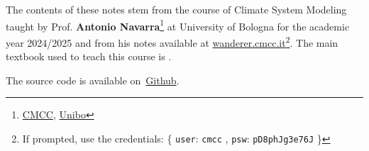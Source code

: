 \documentclass[
    11pt, 
    twoside, 
    english
]{book} %
\begin{document}


\clearpage

\vspace*{\fill}
The contents of these notes stem from the course of Climate System Modeling taught by Prof. \textbf{Antonio Navarra}\footnote{\href{https://www.cmcc.it/people/navarra-a}{CMCC}, \href{https://www.unibo.it/sitoweb/antonio.navarra/en}{Unibo}}
at University of Bologna for the academic year 2024/2025 and from his notes available at
\href{https://wanderer.cmcc.it}{wanderer.cmcc.it}\footnote{
	If prompted, use the credentials: \{ \texttt{user}: \texttt{cmcc}  ,
	\texttt{psw}: \texttt{pD8phJg3e76J} \} }.
The main textbook used to teach this course is \citet{Washington2005}.

The source code is available on~\href{https://github.com/cristinalbini/climate_sistem_modeling}{Github}.
\vspace*{\fill}

\tableofcontents
\newpage
















\printbibliography
{}
\end{document}
